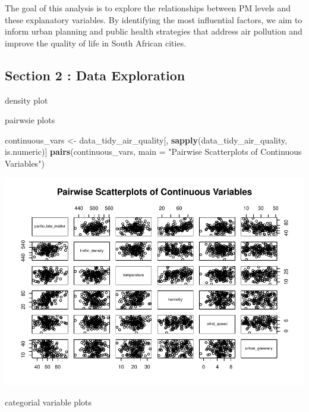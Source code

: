 \documentclass[
]{article}
\newenvironment{Shaded}{\begin{snugshade}}{\end{snugshade}}
\newcommand{\AttributeTok}[1]{\textcolor[rgb]{0.13,0.29,0.53}{#1}}
\newcommand{\FunctionTok}[1]{\textcolor[rgb]{0.13,0.29,0.53}{\textbf{#1}}}
\newcommand{\NormalTok}[1]{#1}
\newcommand{\OtherTok}[1]{\textcolor[rgb]{0.56,0.35,0.01}{#1}}
\newcommand{\StringTok}[1]{\textcolor[rgb]{0.31,0.60,0.02}{#1}}
\begin{document}
\hfill\break
The goal of this analysis is to explore the relationships between PM
levels and these explanatory variables. By identifying the most
influential factors, we aim to inform urban planning and public health
strategies that address air pollution and improve the quality of life in
South African cities.

\hypertarget{section-2-data-exploration}{%
\subsection{Section 2 : Data
Exploration}\label{section-2-data-exploration}}

density plot

pairwsie plots

\begin{Shaded}
\begin{Highlighting}[]
\NormalTok{continuous\_vars }\OtherTok{\textless{}{-}}\NormalTok{ data\_tidy\_air\_quality[, }\FunctionTok{sapply}\NormalTok{(data\_tidy\_air\_quality, is.numeric)]}
\FunctionTok{pairs}\NormalTok{(continuous\_vars, }\AttributeTok{main =} \StringTok{"Pairwise Scatterplots of Continuous Variables"}\NormalTok{)}
\end{Highlighting}
\end{Shaded}

\includegraphics{Report_files/figure-latex/unnamed-chunk-1-1.pdf}

categorial variable plots
\end{document}

